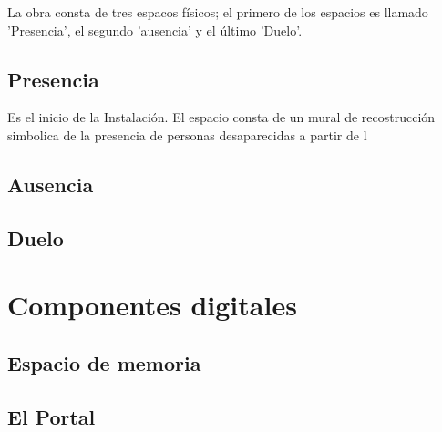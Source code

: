 La obra consta de tres espacos físicos; el primero de los espacios es llamado 'Presencia', el segundo 'ausencia' y el último 'Duelo'.

\subsection{Presencia}

Es el inicio de la Instalación. El espacio consta de un mural de recostrucción simbolica de la presencia de personas desaparecidas a partir de l

\subsection{Ausencia}

\subsection{Duelo}

\section{Componentes digitales}

\subsection{Espacio de memoria}

\subsection{El Portal}
